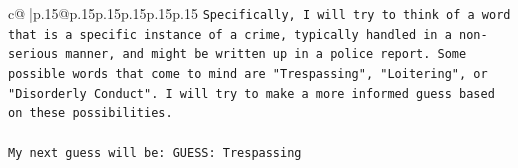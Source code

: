 \documentclass{article}
\begin{document}
{\begin{supertabular}{c@{$\;$}|p{.15\linewidth}@{}p{.15\linewidth}p{.15\linewidth}p{.15\linewidth}p{.15\linewidth}p{.15\linewidth}}
{{{\texttt{Specifically, I will try to think of a word that is a specific instance of a crime, typically handled in a non{-}serious manner, and might be written up in a police report. Some possible words that come to mind are "Trespassing", "Loitering", or "Disorderly Conduct". I will try to make a more informed guess based on these possibilities.} \\
\\ 
\texttt{My next guess will be: GUESS: Trespassing} \\
            }
        }
    }
     \\ \\

\end{supertabular}
}
\end{document}
